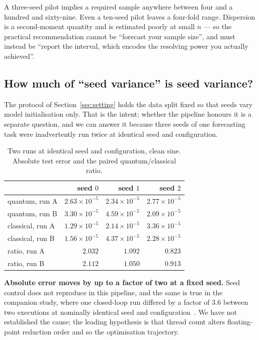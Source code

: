 \documentclass[11pt,onecolumn]{article}
\begin{document}
A three-seed pilot implies a required sample anywhere between four and a
hundred and sixty-nine. Even a ten-seed pilot leaves a four-fold range.
Dispersion is a second-moment quantity and is estimated poorly at small
$n$ --- so the practical recommendation cannot be ``forecast your sample
size'', and must instead be ``report the interval, which encodes the
resolving power you actually achieved''.

\subsection{How much of ``seed variance'' is seed variance?}
\label{sec:repeat}
The protocol of Section~\ref{sec:setting} holds the data split fixed so
that seeds vary model initialisation only. That is the intent; whether
the pipeline honours it is a separate question, and we can answer it
because three seeds of one forecasting task were inadvertently run
twice at identical seed and configuration.

\begin{table}[htb]\centering\small
\caption{Two runs at identical seed and configuration, clean sine.
Absolute test error and the paired quantum/classical ratio.}
\label{tab:repeat}
\begin{tabular}{lrrr}
\toprule
& seed $0$ & seed $1$ & seed $2$ \\
\midrule
quantum, run A   & $2.63\times10^{-5}$ & $2.34\times10^{-5}$ & $2.77\times10^{-5}$ \\
quantum, run B   & $3.30\times10^{-5}$ & $4.59\times10^{-5}$ & $2.09\times10^{-5}$ \\
classical, run A & $1.29\times10^{-5}$ & $2.14\times10^{-5}$ & $3.36\times10^{-5}$ \\
classical, run B & $1.56\times10^{-5}$ & $4.37\times10^{-5}$ & $2.28\times10^{-5}$ \\
\midrule
ratio, run A     & $2.032$ & $1.092$ & $0.823$ \\
ratio, run B     & $2.112$ & $1.050$ & $0.913$ \\
\bottomrule
\end{tabular}
\end{table}

\textbf{Absolute error moves by up to a factor of two at a fixed seed.}
Seed control does not reproduce in this pipeline, and the same is true
in the companion study, where one closed-loop run differed by a factor
of $3.6$ between two executions at nominally identical seed and
configuration~\cite{paperb}. We have not established the cause; the
leading hypothesis is that thread count alters floating-point reduction
order and so the optimisation trajectory.
\end{document}
